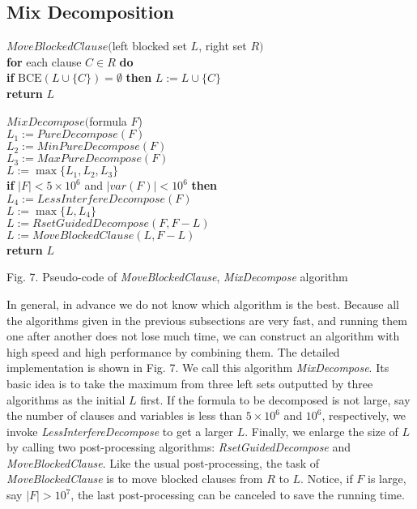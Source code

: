 \documentclass{llncs}
\begin{document}
\subsection{Mix Decomposition}

\begin{flushleft}
\begin{sf}
\begin{footnotesize}
\hskip 22mm $MoveBlockedClause($left blocked set $L$, right set $R)$\\
\hskip 26mm {\bf for } each clause $ C \in R$ {\bf do}\\
\hskip 30mm    {\bf if } $\mathrm{BCE}(L \cup \{C\})=\emptyset$ {\bf then} $L := L \cup \{C\}$\\
\hskip 26mm {\bf return} $L$

\vspace{1em}

\hskip 12mm $MixDecompose($formula $F$)\\
\hskip 16mm $L_1:=PureDecompose(F)$\\
\hskip 16mm $L_2:=MinPureDecompose(F)$\\
\hskip 16mm $L_3:=MaxPureDecompose(F)$\\
\hskip 16mm $L:=\max\{L_1,L_2,L_3\}$\\
\hskip 16mm  {\bf if } $|F|<5\times10^6$ and $|var(F)|<10^6$ {\bf then} \\
\hskip 20mm    $L_4:=LessInterfereDecompose(F)$\\
\hskip 20mm    $L:=\max\{L,L_4\}$\\
\hskip 16mm $L:=RsetGuidedDecompose(F, F-L)$\\
\hskip 16mm $L:=MoveBlockedClause(L,F-L)$\\
\hskip 16mm {\bf return} $L$

\vspace{1em}

\hskip 8mm \textrm{Fig. 7. Pseudo-code of \emph{MoveBlockedClause},
\emph{MixDecompose} algorithm}
\end{footnotesize}
\end{sf}
\end{flushleft}


In general, in advance we do not know which algorithm is the best.
Because all the algorithms given in the previous subsections are
very fast, and running them one after another does not lose much
time, we can construct an algorithm with high speed and high
performance by combining them. The detailed implementation is shown
in Fig. 7. We call this algorithm \emph{MixDecompose}. Its basic
idea is to take the maximum from three left sets outputted by three
algorithms as the initial $L$ first. If the formula to be decomposed
is not large, say the number of clauses and variables is less than
$5\times10^6$ and $10^6$, respectively, we invoke
\emph{LessInterfereDecompose} to get a larger $L$. Finally, we
enlarge the size of $L$ by calling two post-processing algorithms:
\emph{RsetGuidedDecompose} and \emph{MoveBlockedClause}. Like the
usual post-processing, the task of \emph{MoveBlockedClause} is to
move blocked clauses from $R$ to $L$. Notice, if $F$ is large, say
$|F| > 10^7$, the last post-processing can be canceled to save the
running time.
\end{document}
